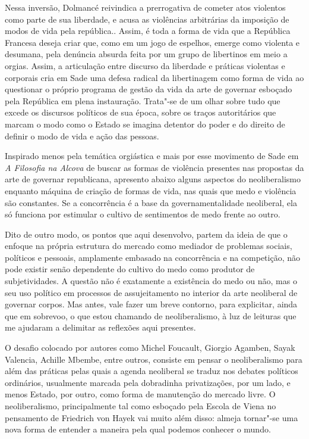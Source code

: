 Nessa inversão, Dolmancé reivindica a prerrogativa de cometer atos
violentos como parte de sua liberdade, e acusa as violências arbitrárias
da imposição de modos de vida pela república.. Assim, é toda a forma de
vida que a República Francesa deseja criar que, como em um jogo de
espelhos, emerge como violenta e desumana, pela denúncia absurda feita
por um grupo de libertinos em meio a orgias. Assim, a articulação entre
discurso da liberdade e práticas violentas e corporais cria em Sade uma
defesa radical da libertinagem como forma de vida ao questionar o
próprio programa de gestão da vida da arte de governar esboçado pela
República em plena instauração. Trata"-se de um olhar sobre tudo que
excede os discursos políticos de sua época, sobre os traços autoritários
que marcam o modo como o Estado se imagina detentor do poder e do
direito de definir o modo de vida e ação das pessoas.

\asterisc

Inspirado menos pela temática orgiástica e mais por esse movimento de
Sade em \emph{A Filosofia na Alcova} de buscar as formas de violência
presentes nas propostas da arte de governar republicana, apresento
abaixo alguns aspectos do neoliberalismo enquanto máquina de criação de
formas de vida, nas quais que medo e violência são constantes. Se a
concorrência é a base da governamentalidade neoliberal, ela só funciona
por estimular o cultivo de sentimentos de medo frente ao outro.

Dito de outro modo, os pontos que aqui desenvolvo, partem da ideia de
que o enfoque na própria estrutura do mercado como mediador de problemas
sociais, políticos e pessoais, amplamente embasado na concorrência e na
competição, não pode existir senão dependente do cultivo do medo como
produtor de subjetividades. A questão não é exatamente a existência do
medo ou não, mas o seu uso político em processos de assujeitamento no
interior da arte neoliberal de governar corpos. Mas antes, vale fazer um
breve contorno, para explicitar, ainda que em sobrevoo, o que estou
chamando de neoliberalismo, à luz de leituras que me ajudaram a
delimitar as reflexões aqui presentes.

\asterisc

O desafio colocado por autores como Michel Foucault, Giorgio Agamben,
Sayak Valencia, Achille Mbembe, entre outros, consiste em pensar o
neoliberalismo para além das práticas pelas quais a agenda neoliberal se
traduz nos debates políticos ordinários, usualmente marcada pela
dobradinha privatizações, por um lado, e menos Estado, por outro, como
forma de manutenção do mercado livre. O neoliberalismo, principalmente
tal como esboçado pela Escola de Viena no pensamento de Friedrich von
Hayek vai muito além disso: almeja tornar"-se uma nova forma de entender
a maneira pela qual podemos conhecer o mundo.

